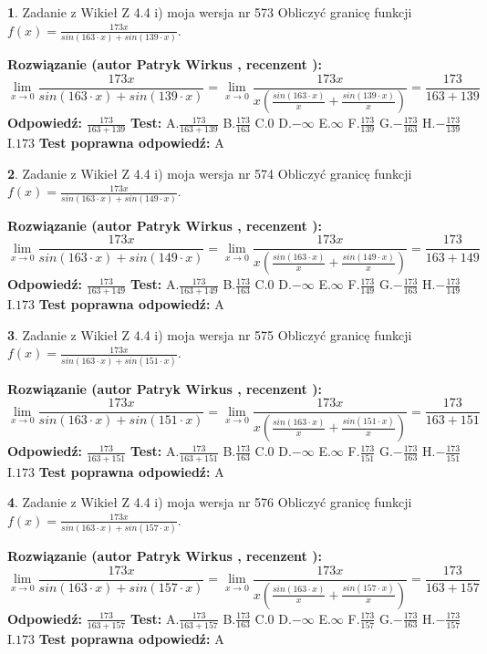 \documentclass[12pt, a4paper]{article}
\theoremstyle{definition} %
\newtheorem{zad}{}
\newcommand{\zadStart}[1]{\begin{zad}#1\newline}
\newcommand{\zadStop}{\end{zad}}
\newcommand{\rozwStart}[2]{\noindent \textbf{Rozwiązanie (autor #1 , recenzent #2): }\newline}
\newcommand{\rozwStop}{\newline}
\newcommand{\odpStart}{\noindent \textbf{Odpowiedź:}\newline}
\newcommand{\odpStop}{\newline}
\newcommand{\testStart}{\noindent \textbf{Test:}\newline}
\newcommand{\testStop}{\newline}
\newcommand{\kluczStart}{\noindent \textbf{Test poprawna odpowiedź:}\newline}
\newcommand{\kluczStop}{\newline}
\begin{document}
\zadStart{Zadanie z Wikieł Z 4.4 i) moja wersja nr 573}
Obliczyć granicę funkcji $f(x)=\frac{173x}{sin(163\cdot x) +sin(139\cdot x)}$.
\zadStop
\rozwStart{Patryk Wirkus}{}
$$\lim\limits_{x\to 0}\frac{173x}{sin(163\cdot x) +sin(139\cdot x)}=\lim\limits_{x\to 0}\frac{173x}{x(\frac{sin(163\cdot x)}{x}+\frac{sin(139\cdot x)}{x})}=\frac{173}{163+139}$$
\rozwStop
\odpStart
$\frac{173}{163+139}$
\odpStop
\testStart
A.$\frac{173}{163+139}$
B.$\frac{173}{163}$
C.$0$
D.$-\infty$
E.$\infty$
F.$\frac{173}{139}$
G.$-\frac{173}{163}$
H.$-\frac{173}{139}$
I.$173$
\testStop
\kluczStart
A
\kluczStop



\zadStart{Zadanie z Wikieł Z 4.4 i) moja wersja nr 574}
Obliczyć granicę funkcji $f(x)=\frac{173x}{sin(163\cdot x) +sin(149\cdot x)}$.
\zadStop
\rozwStart{Patryk Wirkus}{}
$$\lim\limits_{x\to 0}\frac{173x}{sin(163\cdot x) +sin(149\cdot x)}=\lim\limits_{x\to 0}\frac{173x}{x(\frac{sin(163\cdot x)}{x}+\frac{sin(149\cdot x)}{x})}=\frac{173}{163+149}$$
\rozwStop
\odpStart
$\frac{173}{163+149}$
\odpStop
\testStart
A.$\frac{173}{163+149}$
B.$\frac{173}{163}$
C.$0$
D.$-\infty$
E.$\infty$
F.$\frac{173}{149}$
G.$-\frac{173}{163}$
H.$-\frac{173}{149}$
I.$173$
\testStop
\kluczStart
A
\kluczStop



\zadStart{Zadanie z Wikieł Z 4.4 i) moja wersja nr 575}
Obliczyć granicę funkcji $f(x)=\frac{173x}{sin(163\cdot x) +sin(151\cdot x)}$.
\zadStop
\rozwStart{Patryk Wirkus}{}
$$\lim\limits_{x\to 0}\frac{173x}{sin(163\cdot x) +sin(151\cdot x)}=\lim\limits_{x\to 0}\frac{173x}{x(\frac{sin(163\cdot x)}{x}+\frac{sin(151\cdot x)}{x})}=\frac{173}{163+151}$$
\rozwStop
\odpStart
$\frac{173}{163+151}$
\odpStop
\testStart
A.$\frac{173}{163+151}$
B.$\frac{173}{163}$
C.$0$
D.$-\infty$
E.$\infty$
F.$\frac{173}{151}$
G.$-\frac{173}{163}$
H.$-\frac{173}{151}$
I.$173$
\testStop
\kluczStart
A
\kluczStop



\zadStart{Zadanie z Wikieł Z 4.4 i) moja wersja nr 576}
Obliczyć granicę funkcji $f(x)=\frac{173x}{sin(163\cdot x) +sin(157\cdot x)}$.
\zadStop
\rozwStart{Patryk Wirkus}{}
$$\lim\limits_{x\to 0}\frac{173x}{sin(163\cdot x) +sin(157\cdot x)}=\lim\limits_{x\to 0}\frac{173x}{x(\frac{sin(163\cdot x)}{x}+\frac{sin(157\cdot x)}{x})}=\frac{173}{163+157}$$
\rozwStop
\odpStart
$\frac{173}{163+157}$
\odpStop
\testStart
A.$\frac{173}{163+157}$
B.$\frac{173}{163}$
C.$0$
D.$-\infty$
E.$\infty$
F.$\frac{173}{157}$
G.$-\frac{173}{163}$
H.$-\frac{173}{157}$
I.$173$
\testStop
\kluczStart
A
\kluczStop
\end{document}
